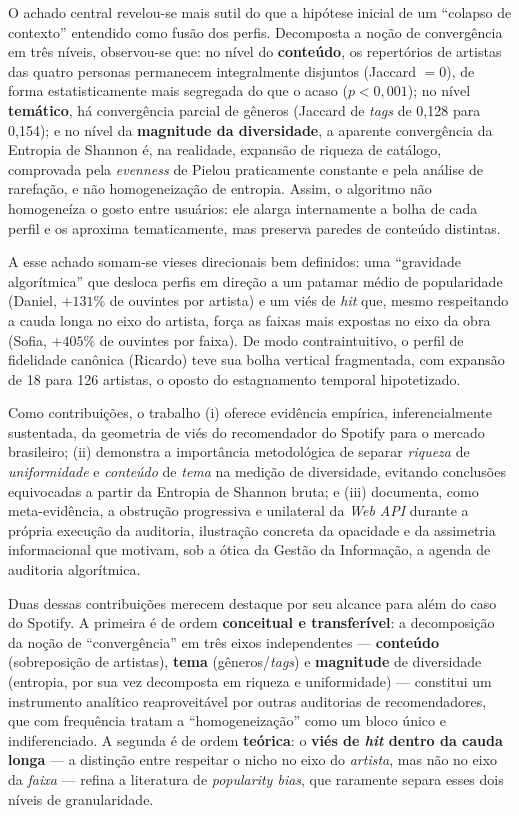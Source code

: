 \documentclass[12pt, %
openright,
oneside, %
a4paper,    %
english,   %
brazil]{facom-ufu-abntex2}
\begin{document}
O achado central revelou-se mais sutil do que a hipótese inicial de um ``colapso
de contexto'' entendido como fusão dos perfis. Decomposta a noção de convergência
em três níveis, observou-se que: no nível do \textbf{conteúdo}, os repertórios de
artistas das quatro personas permanecem integralmente disjuntos (Jaccard $= 0$),
de forma estatisticamente mais segregada do que o acaso ($p < 0{,}001$); no nível
\textbf{temático}, há convergência parcial de gêneros (Jaccard de \emph{tags} de
0,128 para 0,154); e no nível da \textbf{magnitude da diversidade}, a aparente
convergência da Entropia de Shannon é, na realidade, expansão de riqueza de
catálogo, comprovada pela \emph{evenness} de Pielou praticamente constante e
pela análise de rarefação, e não homogeneização de entropia. Assim, o
algoritmo não homogeneíza o gosto entre usuários: ele alarga internamente a bolha
de cada perfil e os aproxima tematicamente, mas preserva paredes de conteúdo
distintas.

A esse achado somam-se vieses direcionais bem definidos: uma ``gravidade
algorítmica'' que desloca perfis em direção a um patamar médio de popularidade
(Daniel, $+131\%$ de ouvintes por artista) e um viés de \emph{hit} que, mesmo
respeitando a cauda longa no eixo do artista, força as faixas mais expostas no
eixo da obra (Sofia, $+405\%$ de ouvintes por faixa). De modo contraintuitivo, o
perfil de fidelidade canônica (Ricardo) teve sua bolha vertical fragmentada, com
expansão de 18 para 126 artistas, o oposto do estagnamento temporal
hipotetizado.

Como contribuições, o trabalho (i) oferece evidência empírica, inferencialmente
sustentada, da geometria de viés do recomendador do Spotify para o mercado
brasileiro; (ii) demonstra a importância metodológica de separar \emph{riqueza}
de \emph{uniformidade} e \emph{conteúdo} de \emph{tema} na medição de
diversidade, evitando conclusões equivocadas a partir da Entropia de Shannon
bruta; e (iii) documenta, como meta-evidência, a obstrução progressiva e
unilateral da \emph{Web API} durante a própria execução da auditoria, 
ilustração concreta da opacidade e da assimetria informacional que motivam, sob a
ótica da Gestão da Informação, a agenda de auditoria algorítmica.

Duas dessas contribuições merecem destaque por seu alcance para além do caso do
Spotify. A primeira é de ordem \textbf{conceitual e transferível}: a decomposição
da noção de ``convergência'' em três eixos independentes --- \textbf{conteúdo}
(sobreposição de artistas), \textbf{tema} (gêneros/\emph{tags}) e
\textbf{magnitude} de diversidade (entropia, por sua vez decomposta em riqueza e
uniformidade) --- constitui um instrumento analítico reaproveitável por outras
auditorias de recomendadores, que com frequência tratam a ``homogeneização''
como um bloco único e indiferenciado. A segunda é de ordem \textbf{teórica}: o
\textbf{viés de \emph{hit} dentro da cauda longa} --- a distinção entre respeitar
o nicho no eixo do \emph{artista}, mas não no eixo da \emph{faixa} --- refina a
literatura de \emph{popularity bias}, que raramente separa esses dois níveis de
granularidade.
\end{document}
